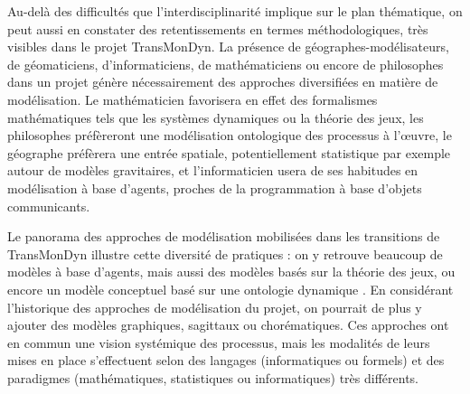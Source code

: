 Au-delà des difficultés que l'interdisciplinarité implique sur le plan thématique, on peut aussi en constater des retentissements en termes méthodologiques, très visibles dans le projet TransMonDyn.
La présence de géographes-modélisateurs, de géomaticiens, d'informaticiens, de mathématiciens ou encore de philosophes dans un projet génère nécessairement des approches diversifiées en matière de modélisation.
Le mathématicien favorisera en effet des formalismes mathématiques tels que les systèmes dynamiques ou la théorie des jeux, les philosophes préfèreront une modélisation ontologique des processus à l'œuvre, le géographe préfèrera une entrée spatiale, potentiellement statistique par exemple autour de modèles gravitaires, et l'informaticien usera de ses habitudes en modélisation à base d'agents, proches de la programmation à base d'objets communicants.

Le panorama des approches de modélisation mobilisées dans les transitions de TransMonDyn illustre cette diversité de pratiques :
	on y retrouve beaucoup de modèles à base d'agents, mais aussi des modèles basés sur la théorie des jeux, ou encore un modèle conceptuel basé sur une ontologie dynamique \autocite{favory_transition_2017}.
En considérant l'historique des approches de modélisation du projet, on pourrait de plus y ajouter des modèles graphiques, sagittaux ou chorématiques.
Ces approches ont en commun une vision systémique des processus, mais les modalités de leurs mises en place s'effectuent selon des langages (informatiques ou formels) et des paradigmes (mathématiques, statistiques ou informatiques) très différents.

